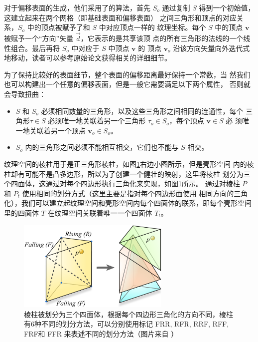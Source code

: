 对于偏移表面的生成，他们采用了\cite{a:SimplificationEnvelopes}的算法，首先 $S_o$ 通过复制 $S$ 得到一个初始值，这建立起来在两个网格（即基础表面和偏移表面） 之间三角形和顶点的对应关系，$S_o$ 中的顶点被赋予了和 $S$ 中对应顶点一样的 纹理坐标。每个 $S$ 中的顶点 $\mathbf{v}$ 被赋予一个“方向”矢量 $\vec{d}$，它表示的是共享该顶 点的所有三角形的法线的一个线性组合。最后再将 $S_o$ 中对应于 $S$ 中顶点 $\mathbf{v}$ 的 顶点 $\mathbf{v}_o$ 沿该方向矢量向外迭代式地移动，读者可以参考原始论文获得相关的详细细节。

为了保持比较好的表面细节，整个表面的偏移距离最好保持一个常数，当 然我们也可以构建出一个任意的偏移表面，但是一般它需要满足以下两个属性， 否则就会导致扭曲：

\begin{itemize}
	\item $S$ 和 $S_o$ 必须相同数量的三角形，以及这些三角形之间相同的连通性，每个 三角形$\tau\in S$ 必须唯一地关联着另一个三角形 $\tau_o \in S_o$，每个顶点 $\mathbf{v}\in S$ 必 须唯一地关联着另一个顶点 $\mathbf{v}_o\in S_o$。
	\item $S_o$ 内的三角形之间必须不能相互相交，它们也不能与 $S$ 相交。
\end{itemize}


纹理空间的棱柱用于是正三角形棱柱，如图\ref{f:df-shell-maps-3}右边小图所示，但是壳形空间 内的棱柱却有可能不是凸多边形，所以为了创建一个健壮的映射，这里将棱柱 划分为三个四面体，这通过对每个四边形执行三角化来实现，如图\ref{f:df-shell-maps-3}所示。 通过对棱柱 $P$ 和 $P_t$ 使用相同的划分方式（这里主要是指对每个四边形面使用 相同方向的三角化），我们可以建立起纹理空间和壳形空间内每个四面体的联系，即每个壳形空间里的四面体 $T$ 在纹理空间关联着唯一一个四面体 $T_t$。

\begin{figure}
	\sidecaption
	\includegraphics[width=0.65\textwidth]{figures/df/shell-maps-3}
	\caption{棱柱被划分为三个四面体，根据每个四边形三角化的方向不同，棱柱有6种不同的划分方法，可以分别使用标记 FRR, RFR, RRF, RFF, FRF和 FFR 来表述不同的划分方法（图片来自 \cite{a:Shell-Maps}）}
	\label{f:df-shell-maps-3}
\end{figure}

